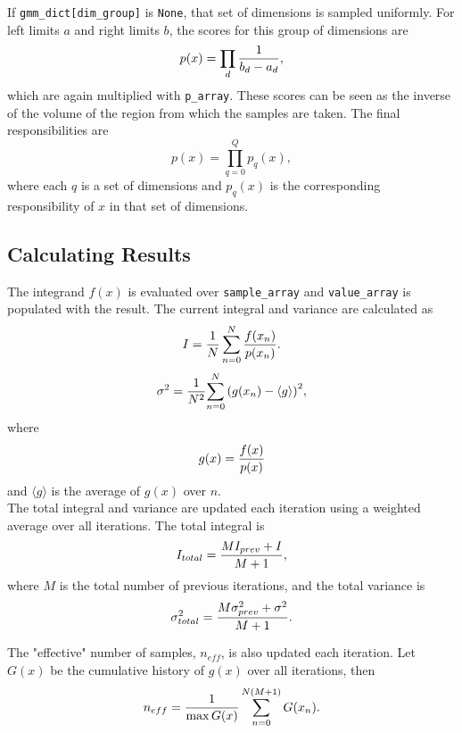 \documentclass{article}
\begin{document}
If \texttt{gmm\_dict[dim\_group]} is \texttt{None}, that set of dimensions is
sampled uniformly. For left limits $a$ and right limits $b$, the scores for this
group of dimensions are
\begin{equation}
    p(x) = \prod_{d} {1 \over {b_d - a_d}},
\end{equation}
which are again multiplied with \texttt{p\_array}. These scores can be seen as
the inverse of the volume of the region from which the samples are taken. The
final responsibilities are
\begin{equation}
    p(x) = \prod_{q=0}^{Q} p_q(x),
\end{equation}
where each $q$ is a set of dimensions and $p_q(x)$ is the corresponding
responsibility of $x$ in that set of dimensions.

\subsection{Calculating Results}

The integrand $f(x)$ is evaluated over \texttt{sample\_array} and \texttt{value\_array}
is populated with the result. The current integral and variance are calculated
as
\begin{equation}
    I = {{1 \over N} \sum_{n=0}^{N} {f(x_n) \over {p(x_n)}}}.
\end{equation}
\begin{equation}
    \sigma^2 = {1 \over N^2}{\sum\limits_{n=0}^{N} {(g(x_n) - \langle g \rangle)}^2},
\end{equation}
where
\begin{equation}
    g(x) = {f(x) \over {p(x)}}
\end{equation}
and $\langle g \rangle$ is the average of $g(x)$ over $n$. \\

The total integral and variance are updated each iteration using a weighted average
over all iterations. The total integral is
\begin{equation}
    I_{total} = {{M I_{prev} + I} \over {M + 1}},
\end{equation}
where $M$ is the total number of previous iterations, and the total variance is
\begin{equation}
    \sigma^2_{total} = {{M \sigma^2_{prev} + \sigma^2} \over {M + 1}}.
\end{equation}

The "effective" number of samples, $n_{eff}$, is also updated each iteration. Let
$G(x)$ be the cumulative history of $g(x)$ over all iterations, then
\begin{equation}
    n_{eff} = {1 \over \max{G(x)}} \sum_{n=0}^{N (M+1)} G(x_n).
\end{equation}
\end{document}
